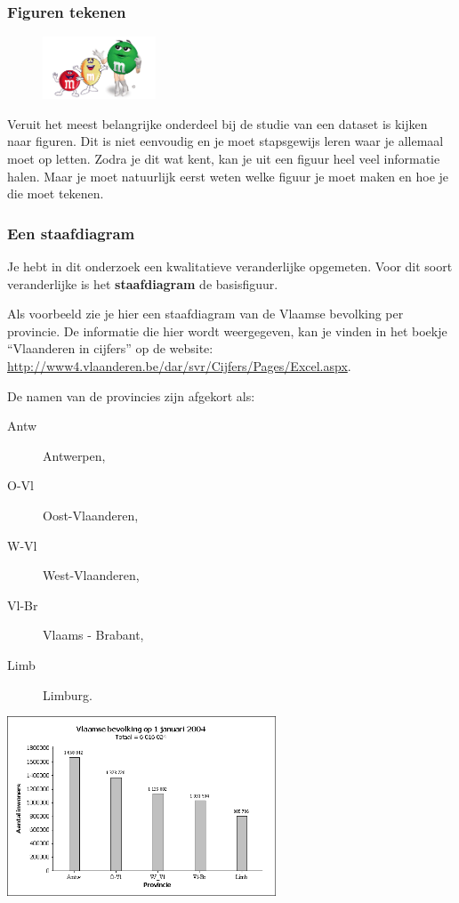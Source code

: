 \documentclass[12pt,twoside]{article}
\begin{document}
\subsubsection{Figuren tekenen}

\begin{figure}
  \vspace{-0.5cm}
  \includegraphics[width=0.3\textwidth]{MenM-fun.png}
\end{figure}

Veruit het meest belangrijke onderdeel bij de studie van een
dataset is kijken naar figuren. Dit is niet eenvoudig en je
moet stapsgewijs leren waar je allemaal moet op letten.
Zodra je dit wat kent, kan je uit een figuur heel veel
informatie halen. Maar je moet natuurlijk eerst weten welke
figuur je moet maken en hoe je die moet tekenen.

\subsubsection*{Een staafdiagram}

Je hebt in dit onderzoek een kwalitatieve veranderlijke opgemeten. Voor dit soort
veranderlijke is het {\bf staafdiagram} de basisfiguur.

Als voorbeeld zie je hier een staafdiagram
van de Vlaamse bevolking per provincie. De
informatie die hier wordt weergegeven, kan
je vinden in het boekje “Vlaanderen in
cijfers” op de website:
\url{http://www4.vlaanderen.be/dar/svr/Cijfers/Pages/Excel.aspx}.

  
\begin{minipage}{0.5\textwidth}
De namen van de provincies zijn afgekort als:
  \begin{description}
    \item[Antw] Antwerpen,
    \item[O-Vl] Oost-Vlaanderen,
    \item[W-Vl] West-Vlaanderen,
    \item[Vl-Br] Vlaams - Brabant,
    \item[Limb] Limburg.
  \end{description}
\end{minipage}
\begin{minipage}{0.5\textwidth}
%  
  \includegraphics[width=8cm]{vlaamse_bevolking.png}
\end{minipage}
\end{document}
